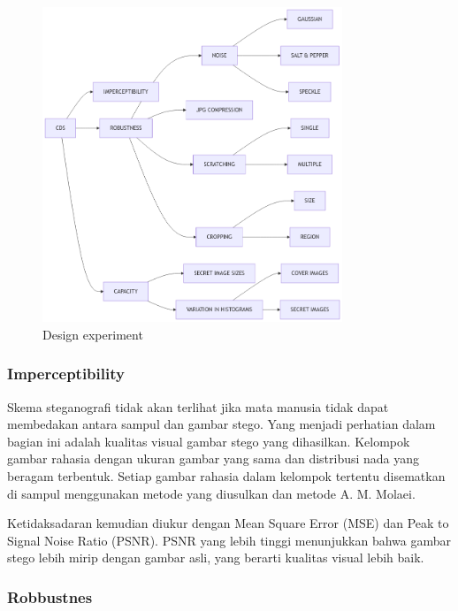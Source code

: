 \documentclass{ittelkom}
\begin{document}
\begin{figure}[htb]
    \centering
    \includegraphics[width=0.8\textwidth]{gambar/experiment.png}
    \caption{Design experiment}
    \label{fig:experiment}
\end{figure}

\subsubsection{Imperceptibility}


Skema steganografi tidak akan terlihat jika mata manusia tidak dapat membedakan
antara sampul dan gambar stego. Yang menjadi perhatian dalam bagian ini adalah
kualitas visual gambar stego yang dihasilkan. Kelompok gambar rahasia dengan
ukuran gambar yang sama dan distribusi nada yang beragam terbentuk. Setiap
gambar rahasia dalam kelompok tertentu disematkan di sampul menggunakan metode
yang diusulkan dan metode A. M. Molaei.

Ketidaksadaran kemudian diukur dengan Mean Square Error (MSE) dan Peak to
Signal Noise Ratio (PSNR). PSNR yang lebih tinggi menunjukkan bahwa gambar
stego lebih mirip dengan gambar asli, yang berarti kualitas visual lebih baik.

\subsubsection{Robbustnes}
\end{document}
